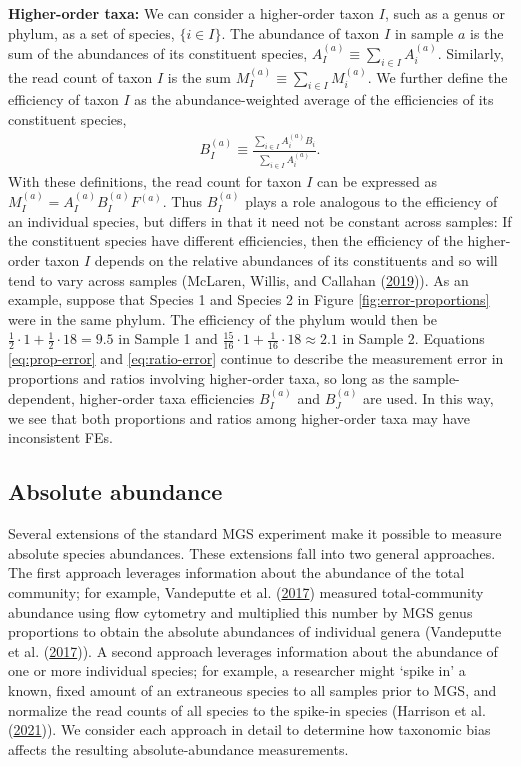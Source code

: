 \documentclass[
]{article}
\begin{document}
\textbf{Higher-order taxa:}
We can consider a higher-order taxon \(I\), such as a genus or phylum, as a set of species, \(\{i \in I\}\).
The abundance of taxon \(I\) in sample \(a\) is the sum of the abundances of its constituent species, \(A_{I}^{(a)} \equiv \sum_{i \in I} A_{i}^{(a)}\).
Similarly, the read count of taxon \(I\) is the sum \(M_{I}^{(a)} \equiv \sum_{i \in I} M_{i}^{(a)}\).
We further define the efficiency of taxon \(I\) as the abundance-weighted average of the efficiencies of its constituent species,
\begin{align}
  \label{eq:efficiency-general}
  B_I^{(a)} \equiv \frac{\sum_{i\in I} A_{i}^{(a)} B_{i}}{\sum_{i\in I} A_{i}^{(a)}}.
\end{align}
With these definitions, the read count for taxon \(I\) can be expressed as
\(M_{I}^{(a)} = A_{I}^{(a)} B_I^{(a)} F^{(a)}\).
Thus \(B_I^{(a)}\) plays a role analogous to the efficiency of an individual species, but differs in that it need not be constant across samples:
If the constituent species have different efficiencies, then the efficiency of the higher-order taxon \(I\) depends on the relative abundances of its constituents and so will tend to vary across samples (McLaren, Willis, and Callahan (\protect\hyperlink{ref-mclaren2019cons}{2019})).
As an example, suppose that Species 1 and Species 2 in Figure \ref{fig:error-proportions} were in the same phylum.
The efficiency of the phylum would then be \(\tfrac{1}{2} \cdot 1 + \tfrac{1}{2} \cdot 18 = 9.5\) in Sample 1 and \(\tfrac{15}{16} \cdot 1 + \tfrac{1}{16} \cdot 18 \approx 2.1\) in Sample 2.
Equations \eqref{eq:prop-error} and \eqref{eq:ratio-error} continue to describe the measurement error in proportions and ratios involving higher-order taxa, so long as the sample-dependent, higher-order taxa efficiencies \(B_I^{(a)}\) and \(B_J^{(a)}\) are used.
In this way, we see that both proportions and ratios among higher-order taxa may have inconsistent FEs.

\hypertarget{absolute-abundance}{%
\subsection{Absolute abundance}\label{absolute-abundance}}

Several extensions of the standard MGS experiment make it possible to measure absolute species abundances.
These extensions fall into two general approaches.
The first approach leverages information about the abundance of the total community; for example, Vandeputte et al. (\protect\hyperlink{ref-vandeputte2017quan}{2017}) measured total-community abundance using flow cytometry and multiplied this number by MGS genus proportions to obtain the absolute abundances of individual genera (Vandeputte et al. (\protect\hyperlink{ref-vandeputte2017quan}{2017})).
A second approach leverages information about the abundance of one or more individual species; for example, a researcher might `spike in' a known, fixed amount of an extraneous species to all samples prior to MGS, and normalize the read counts of all species to the spike-in species (Harrison et al. (\protect\hyperlink{ref-harrison2021theq}{2021})).
We consider each approach in detail to determine how taxonomic bias affects the resulting absolute-abundance measurements.
\end{document}
